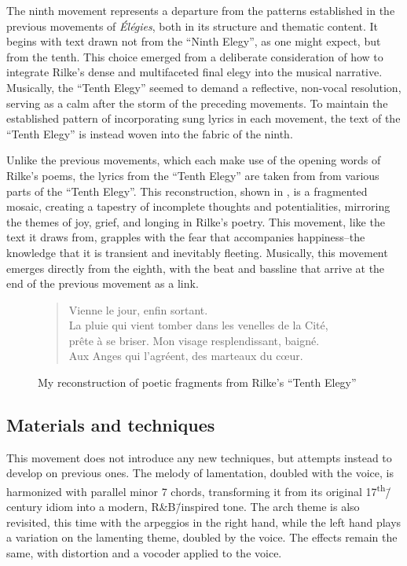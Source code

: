 \documentclass[12pt,twoside,maitrise]{dms_ks}
\theoremstyle{definition}
\begin{document}
{The ninth movement represents a departure from the patterns established in the previous movements of \textit{Élégies}, both in its structure and thematic content. 
It begins with text drawn not from the “Ninth Elegy”, as one might expect, but from the tenth. 
This choice emerged from a deliberate consideration of how to integrate Rilke’s dense and multifaceted final elegy into the musical narrative. 
Musically, the “Tenth Elegy” seemed to demand a reflective, non-vocal resolution, serving as a calm after the storm of the preceding movements. 
To maintain the established pattern of incorporating sung lyrics in each movement, the text of the “Tenth Elegy” is instead woven into the fabric of the ninth.

Unlike the previous movements, which each make use of the opening words of Rilke's poems, the lyrics from the “Tenth Elegy” are taken from from various parts of the “Tenth Elegy”. 
This reconstruction, shown in , is a fragmented mosaic, creating a tapestry of incomplete thoughts and potentialities, mirroring the themes of joy, grief, and longing in Rilke’s poetry. 
This movement, like the text it draws from, grapples with the fear that accompanies happiness--the knowledge that it is transient and inevitably fleeting. 
Musically, this movement emerges directly from the eighth, with the beat and bassline that arrive at the end of the previous movement as a link.

\begin{figure}[H]
\begin{verse}
Vienne le jour, enfin sortant.\\ 
La pluie qui vient tomber dans les venelles de la Cité,\\ 
prête à se briser. Mon visage resplendissant, baigné.\\ 
Aux Anges qui l'agréent, des marteaux du cœur.\\
\end{verse}  
	\caption{My reconstruction of poetic fragments from Rilke's “Tenth Elegy”} 
\label{fig:poem}
\end{figure}

\subsection{Materials and techniques}

This movement does not introduce any new techniques, but attempts instead to develop on previous ones.
The melody of lamentation, doubled with the voice, is harmonized with parallel minor 7 chords, transforming it from its original 17\textsuperscript{th}\=/century idiom into a modern, R\&B\=/inspired tone. 
The arch theme is also revisited, this time with the arpeggios in the right hand, while the left hand plays a variation on the lamenting theme, doubled by the voice.
The effects remain the same, with distortion and a vocoder applied to the voice.

}
\end{document}
